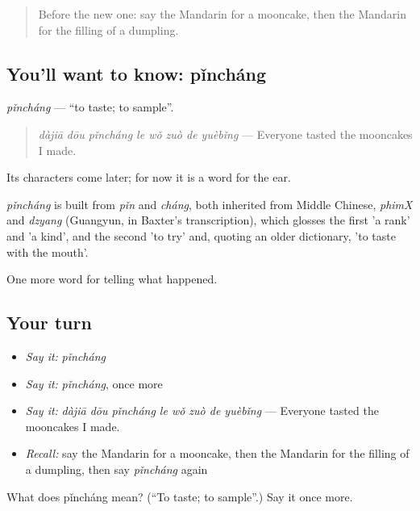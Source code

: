 \label{lesson:ZH-C341-pinchang}



\begin{quote}
Before the new one: say the Mandarin for a mooncake, then the Mandarin for the filling of a dumpling.
\end{quote}

\subsection*{You'll want to know: pǐncháng}
\emph{pǐncháng} — \textquotedblleft{}to taste; to sample\textquotedblright{}.

\begin{quote}
\emph{dàjiā dōu pǐncháng le wǒ zuò de yuèbǐng} — Everyone tasted the mooncakes I made.
\end{quote}

Its characters come later; for now it is a word for the ear.

\begin{cousinweb}
\emph{pǐncháng} is built from \emph{pǐn} and \emph{cháng}, both inherited from Middle Chinese, \emph{phimX} and \emph{dzyang} (Guangyun, in Baxter's transcription), which glosses the first 'a rank' and 'a kind', and the second 'to try' and, quoting an older dictionary, 'to taste with the mouth'.
\end{cousinweb}

\begin{grammarlens}[title={What you've built}]
One more word for telling what happened.
\end{grammarlens}

\subsection*{Your turn}
\begin{itemize}
\raggedright
  \item \emph{Say it:} \emph{pǐncháng}
  \item \emph{Say it:} \emph{pǐncháng}, once more
  \item \emph{Say it:} \emph{dàjiā dōu pǐncháng le wǒ zuò de yuèbǐng} — Everyone tasted the mooncakes I made.
  \item \emph{Recall:} say the Mandarin for a mooncake, then the Mandarin for the filling of a dumpling, then say \emph{pǐncháng} again
\end{itemize}

\begin{tcolorbox}[breakable,colback=teal!4,colframe=teal!35!black,title={Before you move on}]
What does pǐncháng mean? (\textquotedblleft{}To taste; to sample\textquotedblright{}.) Say it once more.
\end{tcolorbox}
